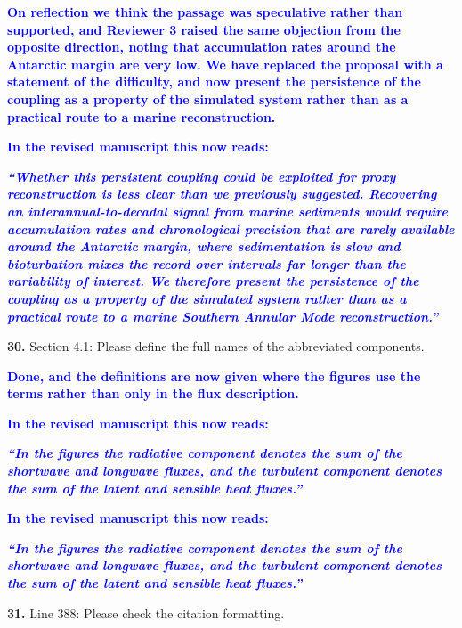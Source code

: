 \documentclass[pdflatex,sn-nature]{sn-jnl}
\begin{document}
\noindent\textcolor{blue}{\textbf{On reflection we think the passage was speculative rather than supported, and Reviewer 3 raised the same objection from the opposite direction, noting that accumulation rates around the Antarctic margin are very low. We have replaced the proposal with a statement of the difficulty, and now present the persistence of the coupling as a property of the simulated system rather than as a practical route to a marine reconstruction.}}


\noindent\textcolor{blue}{\textbf{In the revised manuscript this now reads:}}


\medskip
\noindent\textcolor{blue}{\textbf{\textit{``Whether this persistent coupling could be exploited for proxy reconstruction is less clear than we previously suggested. Recovering an interannual-to-decadal signal from marine sediments would require accumulation rates and chronological precision that are rarely available around the Antarctic margin, where sedimentation is slow and bioturbation mixes the record over intervals far longer than the variability of interest. We therefore present the persistence of the coupling as a property of the simulated system rather than as a practical route to a marine Southern Annular Mode reconstruction.''}}}
\medskip

\medskip
\noindent \textbf{30.} Section 4.1: Please define the full names of the abbreviated components.
\medskip

\noindent\textcolor{blue}{\textbf{Done, and the definitions are now given where the figures use the terms rather than only in the flux description.}}


\noindent\textcolor{blue}{\textbf{In the revised manuscript this now reads:}}


\medskip
\noindent\textcolor{blue}{\textbf{\textit{``In the figures the radiative component denotes the sum of the shortwave and longwave fluxes, and the turbulent component denotes the sum of the latent and sensible heat fluxes.''}}}
\medskip

\noindent\textcolor{blue}{\textbf{In the revised manuscript this now reads:}}


\medskip
\noindent\textcolor{blue}{\textbf{\textit{``In the figures the radiative component denotes the sum of the shortwave and longwave fluxes, and the turbulent component denotes the sum of the latent and sensible heat fluxes.''}}}
\medskip

\medskip
\noindent \textbf{31.} Line 388: Please check the citation formatting.
\medskip
\end{document}
